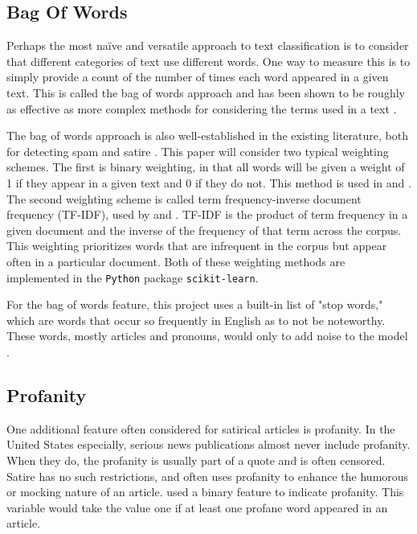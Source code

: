 \documentclass [12 pt] {report}
\begin{document}
\subsection{Bag Of Words}
Perhaps the most na{\"i}ve and versatile approach to text classification is to consider that different categories of text use different words. One way to measure this is to simply provide a count of the number of times each word appeared in a given text. This is called the bag of words approach and has been shown to be roughly as effective as more complex methods for considering the terms used in a text \cite{Sebastiani}.

The bag of words approach is also well-established in the existing literature, both for detecting spam \cite{Blanzieri} and satire \cite{Ahmad} \cite{Burfoot}\cite{Methods}. This paper will consider two typical weighting schemes. The first is binary weighting, in that all words will be given a weight of 1 if they appear in a given text and 0 if they do not. This method is used in \cite{Ahmad} and \cite{Burfoot}. The second weighting scheme is called term frequency-inverse document frequency (TF-IDF), used by \cite{Ahmad} and \cite{fakeNews}. TF-IDF is the product of term frequency in a given document and the inverse of the frequency of that term across the corpus. This weighting prioritizes words that are infrequent in the corpus but appear often in a particular document. Both of these weighting methods are implemented in the \texttt{Python} package \texttt{scikit-learn}.

For the bag of words feature, this project uses a built-in list of "stop words," which are words that occur so frequently in English as to not be noteworthy. These words, mostly articles and pronouns, would only to add noise to the model \cite{Ahmad}.

\subsection{Profanity}
One additional feature often considered for satirical articles is profanity. In the United States especially, serious news publications almost never include profanity. When they do, the profanity is usually part of a quote and is often censored. Satire has no such restrictions, and often uses profanity to enhance the humorous or mocking nature of an article. \cite{Burfoot} used a binary feature to indicate profanity. This variable would take the value one if at least one profane word appeared in an article.
\end{document}

